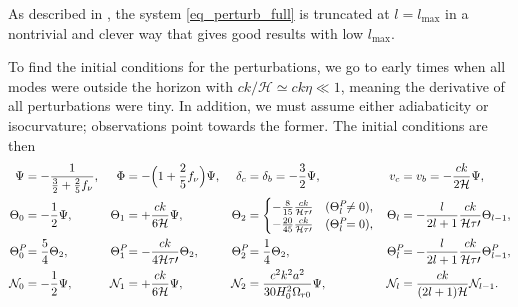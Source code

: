 \documentclass[10pt,a4paper]{article}
\begin{document}
As described in \cite[section V.A.]{callinHowCalculateCMB2006},
the system \eqref{eq_perturb_full} is truncated at $l=l_\text{max}$
in a nontrivial and clever way that gives good results with low $l_\text{max}$.

To find the initial conditions for the perturbations,
we go to early times when all modes were outside the horizon with $ck/\mathcal{H} \simeq ck\eta \ll 1$,
meaning the derivative of all perturbations were tiny.
In addition, we must assume either adiabaticity or isocurvature; observations point towards the former.
The initial conditions are then
\begin{subequations}
\allowdisplaybreaks
\begin{align}
	\Psi &= -\frac{1}{\frac32 + \frac25 f_\nu}, &
	\Phi &= -\Big( 1 + \frac25 f_\nu \Big) \Psi, &
	\delta_c &= \delta_b = -\frac32 \Psi, &
	v_c &= v_b = -\frac{ck}{2\mathcal{H}} \Psi, \\
	\Theta_0 &= -\frac12 \Psi, &
	\Theta_1 &= +\frac{ck}{6\mathcal{H}} \Psi, &
	\Theta_2 &= \begin{cases} -\frac{8}{15} \frac{ck}{\mathcal{H} \tau\prime} & (\Theta^{\mathrlap{P}}_l \neq 0), \\ -\frac{20}{45} \frac{ck}{\mathcal{H} \tau\prime} & (\Theta^{\mathrlap{P}}_l = 0), \end{cases} &
	\Theta_l &= -\frac{l}{2l+1} \frac{ck}{\mathcal{H} \tau\prime} \Theta_{l-1}, \\
	\Theta^{\mathrlap{P}}_0 &= \frac54 \Theta_2, &
	\Theta^{\mathrlap{P}}_1 &= -\frac{ck}{4\mathcal{H}\tau\prime} \Theta_2, &
	\Theta^{\mathrlap{P}}_2 &= \frac14 \Theta_2, &
	\Theta^{\mathrlap{P}}_l &= -\frac{l}{2l+1} \frac{ck}{\mathcal{H}\tau\prime} \Theta^{\mathrlap{P}}_{l-1}, \\
	\N_0 &= -\frac12 \Psi, &
	\N_1 &= +\frac{ck}{6\mathcal{H}} \Psi, &
	\N_2 &=  \frac{c^2 k^2 a^2}{30 H_0^2 \Omega_{r0}} \Psi,&
	\N_l &= \frac{ck}{(2l+1)\mathcal{H}} \N_{l-1}.
\end{align}
\label{eq_perturb_ic}
\end{subequations}
\end{document}

